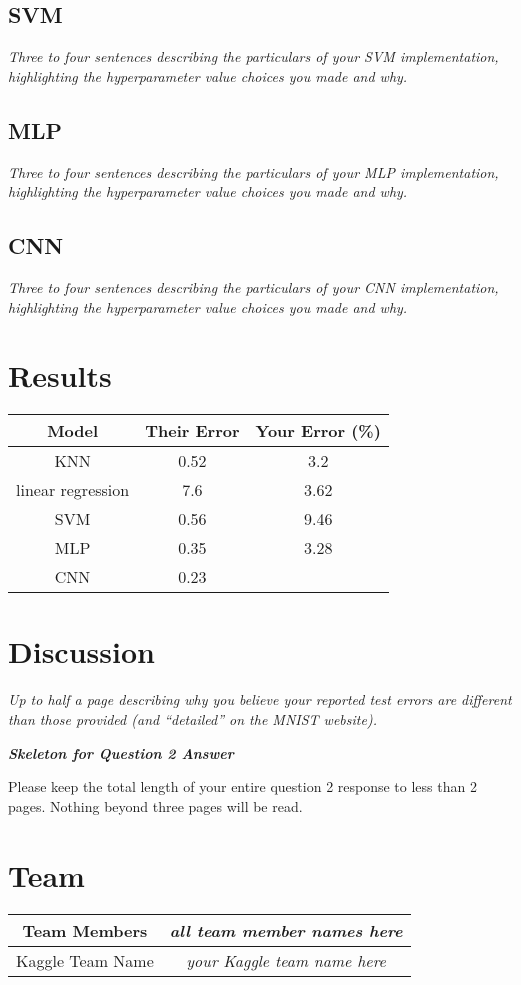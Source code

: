 \documentclass{article}
\begin{document}
\subsection{SVM}
\emph{Three to four sentences describing the particulars of your SVM implementation, highlighting the hyperparameter value choices you made and why.}
\subsection{MLP}
\emph{Three to four sentences describing the particulars of your MLP implementation, highlighting the hyperparameter value choices you made and why.}
\subsection{CNN}
\emph{Three to four sentences describing the particulars of your CNN implementation, highlighting the hyperparameter value choices you made and why.}

\section{Results}
\begin{center}
 \begin{tabular}{|c | c | c|} 
 \hline
 Model & Their Error & Your Error (\%) \\ [0.5ex]
 \hline\hline
 KNN & 0.52 & 3.2 \\
 linear regression & 7.6 & 3.62 \\
 SVM & 0.56 & 9.46 \\
 MLP & 0.35 & 3.28\\
 CNN & 0.23 & \\ 
 \hline
\end{tabular}
\end{center}

\section{Discussion}
\emph{Up to half a page describing why you believe your reported test errors are different than those provided (and ``detailed'' on the MNIST website).}

\newpage

{\em \bf Skeleton for Question 2 Answer}
\setcounter{section}{0}

Please keep the total length of your entire question 2 response to less than 2 pages.  Nothing beyond three pages will be read. 
\section{Team}
\begin{tabular}{|c | c } 
\hline
Team Members & \emph{all team member names here} \\
\hline
Kaggle Team Name & \emph{your Kaggle team name here}\\
\hline
\end{tabular}
\end{document}
